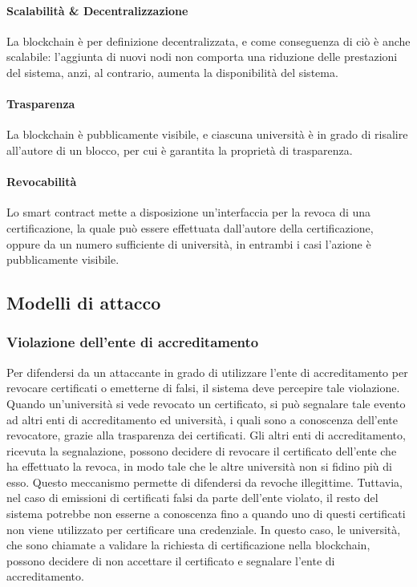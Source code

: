 \documentclass[a4paper,12pt]{article}
\begin{document}
\paragraph{Scalabilità \& Decentralizzazione}
La blockchain è per definizione decentralizzata, e come conseguenza di ciò è anche scalabile: l'aggiunta di nuovi nodi non comporta una riduzione delle prestazioni del sistema, anzi, al contrario, aumenta la disponibilità del sistema. 
\paragraph{Trasparenza}
La blockchain è pubblicamente visibile, e ciascuna università è in grado di risalire all'autore di un blocco, per cui è garantita la proprietà di trasparenza.
\paragraph{Revocabilità}
Lo smart contract mette a disposizione un'interfaccia per la revoca di una certificazione, la quale può essere effettuata dall'autore della certificazione, oppure da un numero sufficiente di università, in entrambi i casi l'azione è pubblicamente visibile.
\subsection{Modelli di attacco}
\subsubsection{Violazione dell’ente di accreditamento}
Per difendersi da un attaccante in grado di utilizzare l'ente di accreditamento per revocare certificati o emetterne di falsi, il sistema deve percepire tale violazione. 
Quando un'università si vede revocato un certificato, si può segnalare tale evento ad altri enti di accreditamento ed università, i quali sono a conoscenza dell'ente revocatore, grazie alla trasparenza dei certificati.
Gli altri enti di accreditamento, ricevuta la segnalazione, possono decidere di revocare il certificato dell'ente che ha effettuato la revoca, in modo tale che le altre università non si fidino più di esso. Questo meccanismo permette di difendersi da revoche illegittime. 
\newline Tuttavia, nel caso di emissioni di certificati falsi da parte dell'ente violato, il resto del sistema potrebbe non esserne a conoscenza fino a quando uno di questi certificati non viene utilizzato per certificare una credenziale. In questo caso, le università, che sono chiamate a validare la richiesta di certificazione nella blockchain, possono decidere di non accettare il certificato e segnalare l'ente di accreditamento.
\end{document}
